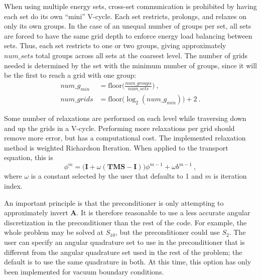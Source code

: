 \documentclass[preprint,12pt]{elsarticle}
\newcommand{\ve}[1]{\ensuremath{\mathbf{#1}}}
\begin{document}
When using multiple energy sets, cross-set communication is prohibited by having each set do its own ``mini'' V-cycle. Each set restricts, prolongs, and relaxes on only its own groups. In the case of an unequal number of groups per set, all sets are forced to have the same grid depth to enforce energy load balancing between sets. Thus, each set restricts to one or two groups, giving approximately $num\_sets$ total groups across all sets at the coarsest level. The number of grids needed is determined by the set with the minimum number of groups, since it will be the first to reach a grid with one group:%
\begin{align}
  num\_g_{min} &= \text{floor}\bigl(\frac{num\_groups}{num\_sets}\bigr) \:, \\
  num\_grids &= \text{floor}\bigl( \log_{2}(num\_g_{min}) \bigr) + 2 \:.
  \label{eq:multisetGrids}
\end{align}

Some number of relaxations are performed on each level while traversing down and up the grids in a V-cycle. Performing more relaxations per grid should remove more error, but has a computational cost. The implemented relaxation method is weighted Richardson Iteration. When applied to the transport equation, this is
%
\begin{equation}
  \phi^{m} = \bigr(\ve{I} + \omega(\ve{TMS} - \ve{I})\bigl)\phi^{m-1} + \omega b^{m-1} \:,
  \label{eq:relax}
 \end{equation}
%
where $\omega$ is a constant selected by the user that defaults to 1 and $m$ is iteration index. 

An important principle is that the preconditioner is only attempting to approximately invert $\ve{A}$. It is therefore reasonable to use a less accurate angular discretization in the preconditioner than the rest of the code. For example, the whole problem may be solved at $S_{10}$, but the preconditioner could use $S_{2}$. The user can specify an angular quadrature set to use in the preconditioner that is different from the angular quadrature set used in the rest of the problem; the default is to use the same quadrature in both. At this time, this option has only been implemented for vacuum boundary conditions. 

\end{document}
